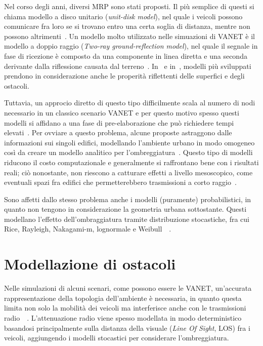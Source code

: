 Nel corso degli anni, diversi MRP sono stati proposti.
Il più semplice di questi si chiama modello a disco unitario (\textit{unit-disk model}), nel quale i veicoli possono comunicare fra loro se si trovano entro una certa soglia
di distanza, mentre non possono altrimenti~\cite{6554832}.
Un modello molto utilizzato nelle simuazioni di VANET è il modello a doppio raggio (\textit{Two-ray ground-reflection model}),
nel quale il segnale in fase di ricezione è composto da una componente in linea diretta e una seconda derivante dalla riflessione causata dal terreno~\cite{DBLP:books/daglib/0091821}.
In~\cite{Schmitz:2006:ERW:1164717.1164730} e in~\cite{Souley2005RealisticUS}, modelli più sviluppati prendono in considerazione anche le properità riflettenti delle superfici e degli ostacoli.

Tuttavia, un approcio diretto di questo tipo difficilmente scala al numero di nodi necessario in un classico scenario VANET e per questo motivo
spesso questi modelli si affidano a una fase di pre-elaborazione che può richiedere tempi elevati~\cite{Stepanov:2008:IMR:1293378.1293656}.
Per ovviare a questo problema, alcune proposte astraggono dalle informazioni sui singoli edifici, modellando l'ambiente urbano in modo omogeneo
così da creare un modello analitico per l'ombreggiatura~\cite{1492678}.
Questo tipo di modelli riducono il costo computazionale e generalmente si raffrontano bene con i risultati reali;
ciò nonostante, non riescono a catturare effetti a livello mesoscopico, come eventuali spazi fra edifici che permetterebbero trasmissioni a corto raggio~\cite{Giordano:2010:CST:1860058.1860065}.

Sono affetti dallo stesso problema anche i modelli (puramente) probabilistici, in quanto non tengono in considerazione la geometria urbana sottostante.
Questi modellano l'effetto dell'ombraggiatura tramite distribuzione stocastiche, fra cui Rice, Rayleigh, Nakagami-m, lognormale e Weibull~\cite{6554832}~\cite{Rappaport:2001:WCP:559977}.
%
\section{Modellazione di ostacoli}\label{sec:modellazione-ostacoli}
Nelle simulazioni di alcuni scenari, come possono essere le VANET, un'accurata rappresentazione della topologia dell'ambiente è necessaria,
in quanto questa limita non solo la mobilità dei veicoli ma interferisce anche con le trasmissioni radio~\cite{7543980}~\cite{amjad2015impact}.
L'attenuazione radio viene spesso modellata in modo deterministico basandosi principalmente sulla distanza della visuale (\textit{Line Of Sight}, LOS)
fra i veicoli, aggiungendo i modelli stocastici per considerare l'ombreggiatura.

